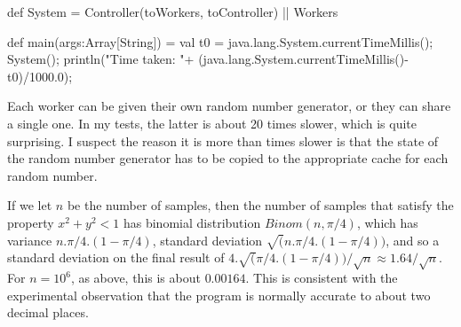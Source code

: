 \begin{nontuteanswer}
\begin{scala}
{  def System = 
    Controller(toWorkers, toController) || Workers

  def main(args:Array[String]) = {
    val t0 = java.lang.System.currentTimeMillis();
    System();
    println("Time taken: "+
      (java.lang.System.currentTimeMillis()-t0)/1000.0);
  }
}
\end{scala}

Each worker can be given their own random number generator, or they can share
a single one.  In my tests, the latter is about 20 times slower, which is quite
surprising.  I suspect the reason it is more than  times
slower is that the state of the random number generator has to be copied to
the appropriate cache for each random number.

If we let $n$ be the number of samples, then the number of samples that
satisfy the property $x^2+y^2<1$ has binomial distribution $Binom(n,\pi/4)$,
which has variance $n.\pi/4.(1-\pi/4)$, standard deviation
$\sqrt(n.\pi/4.(1-\pi/4))$, and so a standard deviation on the final result of
$4.\sqrt(\pi/4.(1-\pi/4)) / \sqrt n \approx 1.64 / \sqrt n$.  For $n = 10^6$, as
above, this is about $0.00164$.  This is consistent with the experimental
observation that the program is normally accurate to about two decimal places.
\end{nontuteanswer}
